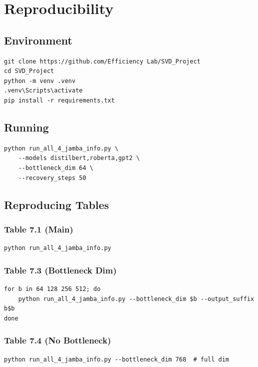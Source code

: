 \section{Reproducibility}

\subsection{Environment}

\begin{lstlisting}
git clone https://github.com/Efficiency Lab/SVD_Project
cd SVD_Project
python -m venv .venv
.venv\Scripts\activate
pip install -r requirements.txt
\end{lstlisting}

\subsection{Running}

\begin{lstlisting}
python run_all_4_jamba_info.py \
    --models distilbert,roberta,gpt2 \
    --bottleneck_dim 64 \
    --recovery_steps 50
\end{lstlisting}

\subsection{Reproducing Tables}

\subsubsection{Table 7.1 (Main)}
\begin{lstlisting}
python run_all_4_jamba_info.py
\end{lstlisting}

\subsubsection{Table 7.3 (Bottleneck Dim)}
\begin{lstlisting}
for b in 64 128 256 512; do
    python run_all_4_jamba_info.py --bottleneck_dim $b --output_suffix b$b
done
\end{lstlisting}

\subsubsection{Table 7.4 (No Bottleneck)}
\begin{lstlisting}
python run_all_4_jamba_info.py --bottleneck_dim 768  # full dim
\end{lstlisting}

